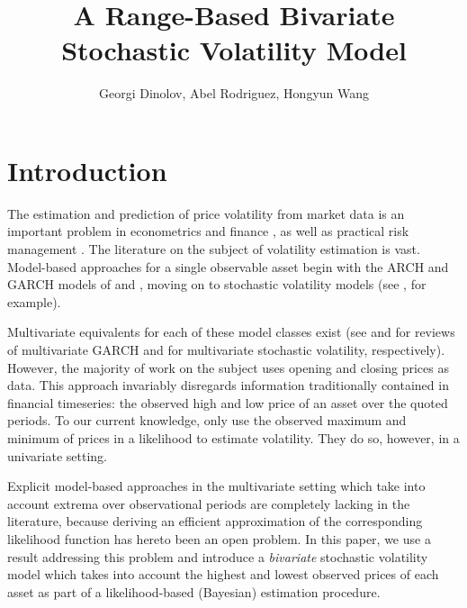 \documentclass[10pt]{article}
\title{A Range-Based Bivariate Stochastic Volatility Model}
\author{Georgi Dinolov, Abel Rodriguez, Hongyun Wang}
\date{} %
\begin{document}
\def\spacingset#1{\renewcommand{\baselinestretch}%
{#1}\small\normalsize} \spacingset{1}

\bigskip

\vspace{1cm}
\noindent

\spacingset{1.00} %
\section{Introduction}

The estimation and prediction of price volatility from market data is
an important problem in econometrics and finance
\citep{abramov2007estimation}, as well as practical risk management
\citep{brandt2006dynamic}. The literature on the subject of volatility
estimation is vast. Model-based approaches for a single observable
asset begin with the ARCH and GARCH models of \cite{engle1982} and
\cite{bollerslev1986}, moving on to stochastic volatility models (see
\cite{shephard2005selected-readings}, for example).

Multivariate equivalents for each of these model classes exist (see
\cite{bauwens2006multivariate} and \cite{asai2006multivariate} for
reviews of multivariate GARCH and for multivariate stochastic
volatility, respectively). However, the majority of work on the
subject uses opening and closing prices as data. This approach
invariably disregards information traditionally contained in financial
timeseries: the observed high and low price of an asset over the
quoted periods. To our current knowledge, only \cite{rodriguez2012}
use the observed maximum and minimum of prices in a likelihood to
estimate volatility. They do so, however, in a univariate
setting.

Explicit model-based approaches in the multivariate setting which take
into account extrema over observational periods are completely lacking
in the literature, because deriving an efficient approximation of the
corresponding likelihood function has hereto been an open problem. In
this paper, we use a result addressing this problem and introduce a
\textit{bivariate} stochastic volatility model which takes into
account the highest and lowest observed prices of each asset as part
of a likelihood-based (Bayesian) estimation procedure.
\end{document}
